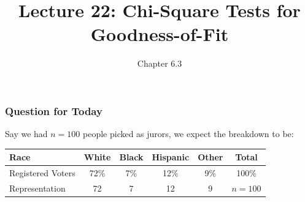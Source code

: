 \documentclass[slides]{beamer}
\title{Lecture 22: Chi-Square Tests for Goodness-of-Fit}
\author{Chapter 6.3}
\date{}
\newcommand{\blue}[1]{\textcolor{blue2}{#1}}
\begin{document}
\begin{frame}
\titlepage
\end{frame}


%
%


\begin{frame}[fragile]
\frametitle{Question for Today}
Say we had $n=100$ people picked as jurors, we \blue{expect} the breakdown to be:

\begin{center}
\begin{tabular}{l||cccc|c}
Race & White & Black & Hispanic & Other & Total \\ 
\hline
Registered Voters & 72\% & 7\% & 12\% & 9\% & 100\%\\ 
Representation & 72 & 7 & 12 & 9 & $n=100$ \\ 
\end{tabular}
\end{center}

\end{frame}


%
%
\end{document}
